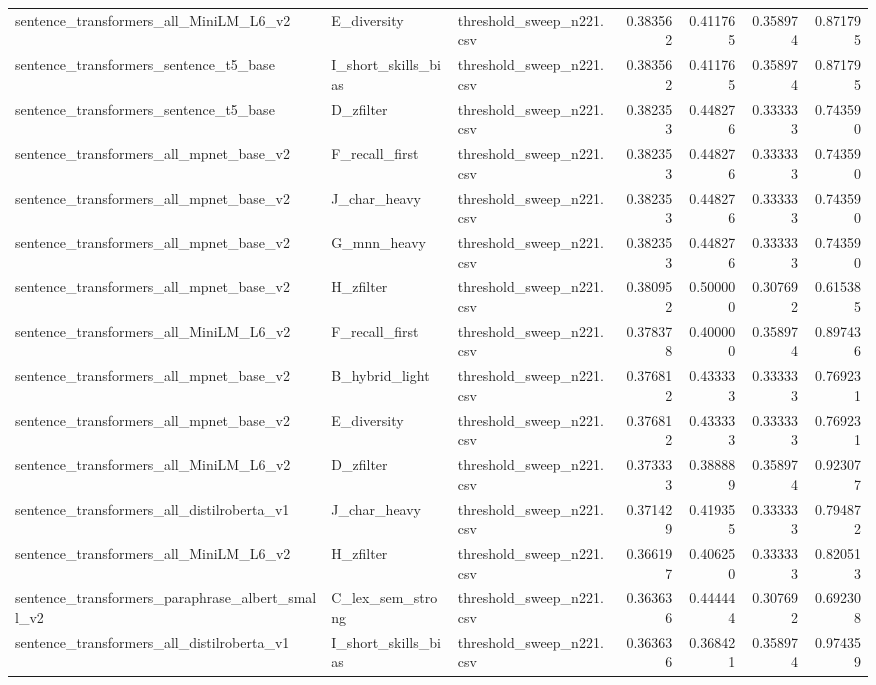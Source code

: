 \begin{table}[!ht]
\begin{tabular}{lllrrrr}
sentence\_transformers\_all\_MiniLM\_L6\_v2 & E\_diversity & threshold\_sweep\_n221.csv & 0.383562 & 0.411765 & 0.358974 & 0.871795 \\
sentence\_transformers\_sentence\_t5\_base & I\_short\_skills\_bias & threshold\_sweep\_n221.csv & 0.383562 & 0.411765 & 0.358974 & 0.871795 \\
sentence\_transformers\_sentence\_t5\_base & D\_zfilter & threshold\_sweep\_n221.csv & 0.382353 & 0.448276 & 0.333333 & 0.743590 \\
sentence\_transformers\_all\_mpnet\_base\_v2 & F\_recall\_first & threshold\_sweep\_n221.csv & 0.382353 & 0.448276 & 0.333333 & 0.743590 \\
sentence\_transformers\_all\_mpnet\_base\_v2 & J\_char\_heavy & threshold\_sweep\_n221.csv & 0.382353 & 0.448276 & 0.333333 & 0.743590 \\
sentence\_transformers\_all\_mpnet\_base\_v2 & G\_mnn\_heavy & threshold\_sweep\_n221.csv & 0.382353 & 0.448276 & 0.333333 & 0.743590 \\
sentence\_transformers\_all\_mpnet\_base\_v2 & H\_zfilter & threshold\_sweep\_n221.csv & 0.380952 & 0.500000 & 0.307692 & 0.615385 \\
sentence\_transformers\_all\_MiniLM\_L6\_v2 & F\_recall\_first & threshold\_sweep\_n221.csv & 0.378378 & 0.400000 & 0.358974 & 0.897436 \\
sentence\_transformers\_all\_mpnet\_base\_v2 & B\_hybrid\_light & threshold\_sweep\_n221.csv & 0.376812 & 0.433333 & 0.333333 & 0.769231 \\
sentence\_transformers\_all\_mpnet\_base\_v2 & E\_diversity & threshold\_sweep\_n221.csv & 0.376812 & 0.433333 & 0.333333 & 0.769231 \\
sentence\_transformers\_all\_MiniLM\_L6\_v2 & D\_zfilter & threshold\_sweep\_n221.csv & 0.373333 & 0.388889 & 0.358974 & 0.923077 \\
sentence\_transformers\_all\_distilroberta\_v1 & J\_char\_heavy & threshold\_sweep\_n221.csv & 0.371429 & 0.419355 & 0.333333 & 0.794872 \\
sentence\_transformers\_all\_MiniLM\_L6\_v2 & H\_zfilter & threshold\_sweep\_n221.csv & 0.366197 & 0.406250 & 0.333333 & 0.820513 \\
sentence\_transformers\_paraphrase\_albert\_small\_v2 & C\_lex\_sem\_strong & threshold\_sweep\_n221.csv & 0.363636 & 0.444444 & 0.307692 & 0.692308 \\
sentence\_transformers\_all\_distilroberta\_v1 & I\_short\_skills\_bias & threshold\_sweep\_n221.csv & 0.363636 & 0.368421 & 0.358974 & 0.974359 \\

\end{tabular}
\end{table}
